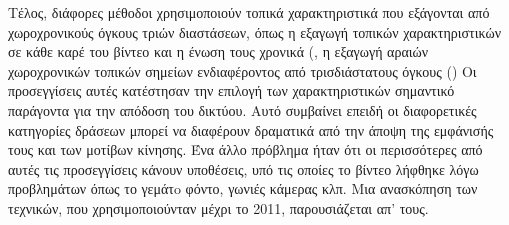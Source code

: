 Τέλος, διάφορες μέθοδοι χρησιμοποιούν τοπικά χαρακτηριστικά που εξάγονται από χωροχρονικούς όγκους τριών διαστάσεων,
όπως η εξαγωγή τοπικών χαρακτηριστικών σε κάθε καρέ του βίντεο και η ένωση τους χρονικά (\en\cite{784616, 990935, 1544882}\gr,
η εξαγωγή αραιών χωροχρονικών τοπικών σημείων ενδιαφέροντος από τρισδιάστατους όγκους (\en\cite{1238378, 1570899,  Niebles, 1467373, Ryoo2006}\gr)
Οι προσεγγίσεις αυτές κατέστησαν την επιλογή των χαρακτηριστικών  σημαντικό παράγοντα για την απόδοση του δικτύου.
Αυτό συμβαίνει επειδή οι διαφορετικές κατηγορίες δράσεων μπορεί να διαφέρουν δραματικά από την άποψη της εμφάνισής τους και των μοτίβων κίνησης.
Ένα άλλο πρόβλημα ήταν ότι οι περισσότερες από αυτές τις προσεγγίσεις κάνουν υποθέσεις, υπό τις οποίες το βίντεο λήφθηκε λόγω προβλημάτων όπως το γεμάτo
φόντο,  γωνιές κάμερας κλπ. Μια ανασκόπηση των τεχνικών, που χρησιμοποιούνταν  μέχρι το 2011, παρουσιάζεται απ' τους\en\cite{Aggarwal:2011:HAA:1922649.1922653}\gr.  \par

